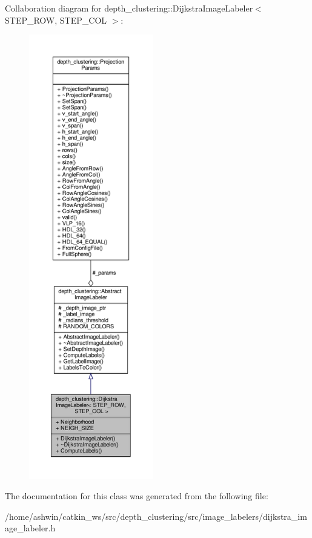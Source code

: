 Collaboration diagram for depth\+\_\+clustering\+:\+:Dijkstra\+Image\+Labeler$<$ S\+T\+E\+P\+\_\+\+R\+OW, S\+T\+E\+P\+\_\+\+C\+OL $>$\+:\nopagebreak
\begin{figure}[H]
\begin{center}
\leavevmode
\includegraphics[height=550pt]{classdepth__clustering_1_1DijkstraImageLabeler__coll__graph}
\end{center}
\end{figure}


The documentation for this class was generated from the following file\+:\begin{DoxyCompactItemize}
\item 
/home/ashwin/catkin\+\_\+ws/src/depth\+\_\+clustering/src/image\+\_\+labelers/dijkstra\+\_\+image\+\_\+labeler.\+h\end{DoxyCompactItemize}

